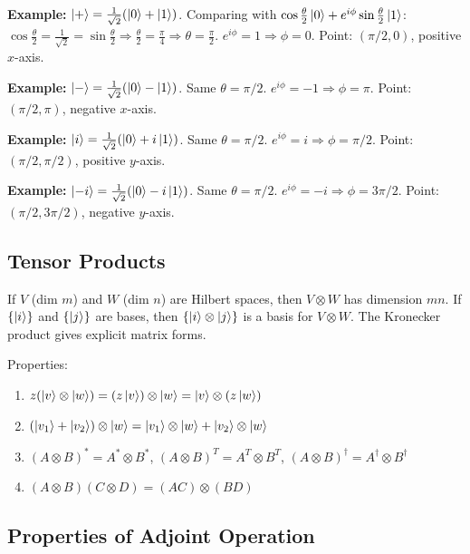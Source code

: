 \documentclass[10pt,a4paper]{article}
\begin{document}
\textbf{Example:} $\ket{+}=\frac{1}{\sqrt{2}}(\ket{0}+\ket{1})$. Comparing with $\cos\frac{\theta}{2}\ket{0}+e^{i\phi}\sin\frac{\theta}{2}\ket{1}$:
$\cos\frac{\theta}{2}=\frac{1}{\sqrt{2}}=\sin\frac{\theta}{2}\Rightarrow\frac{\theta}{2}=\frac{\pi}{4}\Rightarrow\theta=\frac{\pi}{2}$. $e^{i\phi}=1\Rightarrow\phi=0$. Point: $(\pi/2,0)$, positive $x$-axis.

\textbf{Example:} $\ket{-}=\frac{1}{\sqrt{2}}(\ket{0}-\ket{1})$. Same $\theta=\pi/2$. $e^{i\phi}=-1\Rightarrow\phi=\pi$. Point: $(\pi/2,\pi)$, negative $x$-axis.

\textbf{Example:} $\ket{i}=\frac{1}{\sqrt{2}}(\ket{0}+i\ket{1})$. Same $\theta=\pi/2$. $e^{i\phi}=i\Rightarrow\phi=\pi/2$. Point: $(\pi/2,\pi/2)$, positive $y$-axis.

\textbf{Example:} $\ket{-i}=\frac{1}{\sqrt{2}}(\ket{0}-i\ket{1})$. Same $\theta=\pi/2$. $e^{i\phi}=-i\Rightarrow\phi=3\pi/2$. Point: $(\pi/2,3\pi/2)$, negative $y$-axis.

\subsection{Tensor Products}

\begin{tcolorbox}[defstyle, title={Definition: Tensor Product}]
If $V$ (dim $m$) and $W$ (dim $n$) are Hilbert spaces, then $V\otimes W$ has dimension $mn$. If $\{\ket{i}\}$ and $\{\ket{j}\}$ are bases, then $\{\ket{i}\otimes\ket{j}\}$ is a basis for $V\otimes W$. The Kronecker product gives explicit matrix forms.

Properties:
\begin{enumerate}[nosep]
\item $z(\ket{v}\otimes\ket{w})=(z\ket{v})\otimes\ket{w}=\ket{v}\otimes(z\ket{w})$
\item $(\ket{v_1}+\ket{v_2})\otimes\ket{w}=\ket{v_1}\otimes\ket{w}+\ket{v_2}\otimes\ket{w}$
\item $(A\otimes B)^*=A^*\otimes B^*$,\; $(A\otimes B)^T=A^T\otimes B^T$,\; $(A\otimes B)^\dagger=A^\dagger\otimes B^\dagger$
\item $(A\otimes B)(C\otimes D)=(AC)\otimes(BD)$
\end{enumerate}
\end{tcolorbox}

\subsection{Properties of Adjoint Operation}
\end{document}

